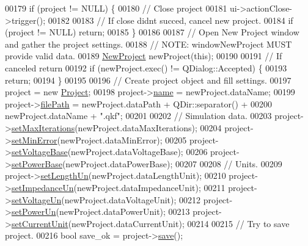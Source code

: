 \begin{DoxyCode}
00179   \textcolor{keywordflow}{if} (project != NULL) \{
00180     \textcolor{comment}{// Close project}
00181     ui->actionClose->trigger();
00182 
00183     \textcolor{comment}{// If close didnt succed, cancel new project.}
00184     \textcolor{keywordflow}{if} (project != NULL) \textcolor{keywordflow}{return};
00185   \}
00186 
00187   \textcolor{comment}{// Open New Project window and gather the project settings.}
00188   \textcolor{comment}{// NOTE: windowNewProject MUST provide valid data.}
00189   \hyperlink{class_new_project}{NewProject} newProject(\textcolor{keyword}{this});
00190 
00191   \textcolor{comment}{// If canceled return}
00192   \textcolor{keywordflow}{if} (newProject.exec() != QDialog::Accepted) \{
00193     \textcolor{keywordflow}{return};
00194   \}
00195 
00196   \textcolor{comment}{// Create project object and fill settings.}
00197   project = \textcolor{keyword}{new} \hyperlink{class_project}{Project};
00198   project->\hyperlink{class_project_a82dd2d1bc38f9fd08c9a811fcaa76b38}{name} = newProject.dataName;
00199   project->\hyperlink{class_project_a79f30adcefd0b72bd4ac7db724bc9531}{filePath} = newProject.dataPath + QDir::separator() +
00200                       newProject.dataName + \textcolor{stringliteral}{".qkf"};
00201 
00202   \textcolor{comment}{// Simulation data.}
00203   project->\hyperlink{class_project_af2046a5d542d3e3dd51cb9cb04604e8f}{setMaxIterations}(newProject.dataMaxIterations);
00204   project->\hyperlink{class_project_a2cb776c39adb42a1113bf7887d0d4636}{setMinError}(newProject.dataMinError);
00205   project->\hyperlink{class_project_a494c3e89851f754188c7abaedbf77ef6}{setVoltageBase}(newProject.dataVoltageBase);
00206   project->\hyperlink{class_project_abb4df805b3cd3af509a41e657eb4bb83}{setPowerBase}(newProject.dataPowerBase);
00207 
00208   \textcolor{comment}{// Units.}
00209   project->\hyperlink{class_project_a846ee2284b0856d461b35d78d9f8e1d6}{setLengthUn}(newProject.dataLengthUnit);
00210   project->\hyperlink{class_project_a995d050781923522ae2a02728346d199}{setImpedanceUn}(newProject.dataImpedanceUnit);
00211   project->\hyperlink{class_project_aa26b488b2e93c8a8c6b4423ce07df4a1}{setVoltageUn}(newProject.dataVoltageUnit);
00212   project->\hyperlink{class_project_aa46b8645d2047c1a2e8d329b9ebbc120}{setPowerUn}(newProject.dataPowerUnit);
00213   project->\hyperlink{class_project_a64d9800bc3acafcfa4d3f45ee5aacc6d}{setCurrentUnit}(newProject.dataCurrentUnit);
00214 
00215   \textcolor{comment}{// Try to save project.}
00216   \textcolor{keywordtype}{bool} save\_ok = project->\hyperlink{class_project_a596a875bc5be73bc5b1b71b6448c1e07}{save}();

\end{DoxyCode}
